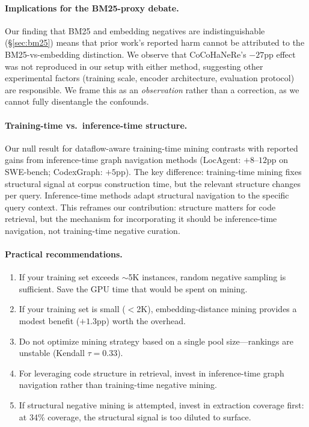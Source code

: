 \documentclass[11pt,a4paper]{article}
\begin{document}
\paragraph{Implications for the BM25-proxy debate.}
Our finding that BM25 and embedding negatives are indistinguishable (\S\ref{sec:bm25}) means that prior work's reported harm cannot be attributed to the BM25-vs-embedding distinction.
We observe that CoCoHaNeRe's $-27$pp effect was not reproduced in our setup with either method, suggesting other experimental factors (training scale, encoder architecture, evaluation protocol) are responsible.
We frame this as an \emph{observation} rather than a correction, as we cannot fully disentangle the confounds.

\paragraph{Training-time vs.\ inference-time structure.}
Our null result for dataflow-aware training-time mining contrasts with reported gains from inference-time graph navigation methods (LocAgent: $+8$--$12$pp on SWE-bench; CodexGraph: $+5$pp).
The key difference: training-time mining fixes structural signal at corpus construction time, but the relevant structure changes per query.
Inference-time methods adapt structural navigation to the specific query context.
This reframes our contribution: structure matters for code retrieval, but the mechanism for incorporating it should be inference-time navigation, not training-time negative curation.

\paragraph{Practical recommendations.}
\begin{enumerate}
    \item If your training set exceeds $\sim$5K instances, random negative sampling is sufficient. Save the GPU time that would be spent on mining.
    \item If your training set is small ($<$2K), embedding-distance mining provides a modest benefit ($+1.3$pp) worth the overhead.
    \item Do not optimize mining strategy based on a single pool size---rankings are unstable (Kendall $\tau = 0.33$).
    \item For leveraging code structure in retrieval, invest in inference-time graph navigation rather than training-time negative mining.
    \item If structural negative mining is attempted, invest in extraction coverage first: at 34\% coverage, the structural signal is too diluted to surface.
\end{enumerate}
\end{document}
